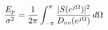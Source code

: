 \documentclass[preview]{standalone}
\begin{document}
\begin{align*}
\special{dvisvgm:raw <g id='unique000'>}\frac{E_p}{\sigma^2}=\frac{1}{2\pi}\int_{-\pi}^{\pi}\frac{|S(e^{j\Omega})|^2}{D_{vv}(e^{j\Omega})}\,d\Omega\special{dvisvgm:raw </g>}
\end{align*}
\end{document}
